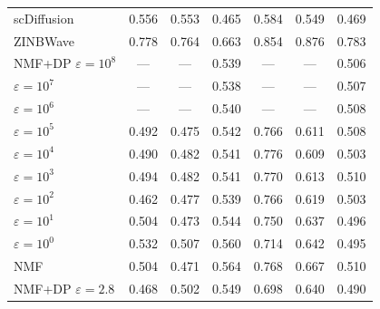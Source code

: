 \begin{tabular}{lccc|ccc}
\addlinespace[2pt]
scDiffusion & 0.556 & 0.553 & 0.465 & 0.584 & 0.549 & 0.469 \\
\addlinespace[2pt]
ZINBWave & 0.778 & 0.764 & 0.663 & 0.854 & 0.876 & 0.783 \\
\addlinespace[2pt]
NMF+DP $\varepsilon=10^{8}$ & --- & --- & 0.539 & --- & --- & 0.506 \\
$\varepsilon=10^{7}$ & --- & --- & 0.538 & --- & --- & 0.507 \\
$\varepsilon=10^{6}$ & --- & --- & 0.540 & --- & --- & 0.508 \\
$\varepsilon=10^{5}$ & 0.492 & 0.475 & 0.542 & 0.766 & 0.611 & 0.508 \\
$\varepsilon=10^{4}$ & 0.490 & 0.482 & 0.541 & 0.776 & 0.609 & 0.503 \\
$\varepsilon=10^{3}$ & 0.494 & 0.482 & 0.541 & 0.770 & 0.613 & 0.510 \\
$\varepsilon=10^{2}$ & 0.462 & 0.477 & 0.539 & 0.766 & 0.619 & 0.503 \\
$\varepsilon=10^{1}$ & 0.504 & 0.473 & 0.544 & 0.750 & 0.637 & 0.496 \\
$\varepsilon=10^{0}$ & 0.532 & 0.507 & 0.560 & 0.714 & 0.642 & 0.495 \\
\addlinespace[2pt]
NMF & 0.504 & 0.471 & 0.564 & 0.768 & 0.667 & 0.510 \\
NMF+DP $\varepsilon=2.8$ & 0.468 & 0.502 & 0.549 & 0.698 & 0.640 & 0.490 \\
\bottomrule
\end{tabular}

